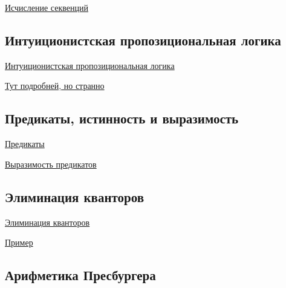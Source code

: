 \documentclass{article}
\begin{document}
\href{https://ru.wikipedia.org/wiki/%D0%98%D1%81%D1%87%D0%B8%D1%81%D0%BB%D0%B5%D0%BD%D0%B8%D0%B5_%D1%81%D0%B5%D0%BA%D0%B2%D0%B5%D0%BD%D1%86%D0%B8%D0%B9}{Исчисление секвенций}


\subsection{ Интуиционистская пропозициональная логика}

\href{https://ru.wikipedia.org/wiki/%D0%98%D0%BD%D1%82%D1%83%D0%B8%D1%86%D0%B8%D0%BE%D0%BD%D0%B8%D1%81%D1%82%D1%81%D0%BA%D0%B0%D1%8F_%D0%BB%D0%BE%D0%B3%D0%B8%D0%BA%D0%B0}{ Интуиционистская пропозициональная логика}

\href{https://ru.frwiki.wiki/wiki/Logique_intuitionniste}{Тут подробней, но странно}

\subsection{Предикаты, истинность и выразимость}

\href{https://mipt.lectoriy.ru/file/synopsis/pdf/Maths-MathemLogic-M07-Musatov-141015.03.pdf}{Предикаты}

\href{http://ru.discrete-mathematics.org/fall2017/1/logic_pmi/lecture-10-11-expressibility.pdf}{Выразимость предикатов}


\subsection{Элиминация кванторов}

\href{https://ru.wikipedia.org/wiki/%D0%AD%D0%BB%D0%B8%D0%BC%D0%B8%D0%BD%D0%B0%D1%86%D0%B8%D1%8F_%D0%BA%D0%B2%D0%B0%D0%BD%D1%82%D0%BE%D1%80%D0%BE%D0%B2#:~:text=%D0%AD%D0%BB%D0%B8%D0%BC%D0%B8%D0%BD%D0%B0%D1%86%D0%B8%D1%8F%20%D0%BA%D0%B2%D0%B0%D0%BD%D1%82%D0%BE%D1%80%D0%BE%D0%B2%20%E2%80%94%20%D0%BF%D0%BE%D0%BB%D1%83%D1%87%D0%B5%D0%BD%D0%B8%D0%B5%20%D0%BF%D0%BE%20%D0%B7%D0%B0%D0%B4%D0%B0%D0%BD%D0%BD%D0%BE%D0%B9,%D1%81%D0%BE%D0%B4%D0%B5%D1%80%D0%B6%D0%B0%D1%82%D0%B5%D0%BB%D1%8C%D0%BD%D1%8B%D1%85%20%D1%80%D0%B5%D0%B7%D1%83%D0%BB%D1%8C%D1%82%D0%B0%D1%82%D0%BE%D0%B2%20%D0%BE%D0%B1%20%D1%8D%D1%82%D0%BE%D0%B9%20%D1%82%D0%B5%D0%BE%D1%80%D0%B8%D0%B8.}{Элиминация кванторов}

\href{https://studfile.net/preview/6844674/page:4/}{Пример}

\subsection{Арифметика Пресбургера}
\end{document}

